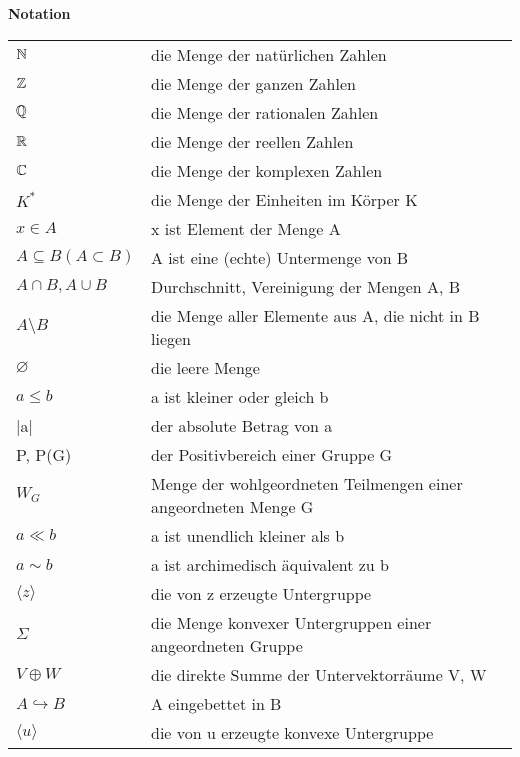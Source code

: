 \newpage
{\LARGE \textbf{Notation}}
\vspace{1.6cm}
\begin{center}
\begin{tabular}{ll}
  $\mathbb{N}$ & die Menge der natürlichen Zahlen \\
  $\mathbb{Z}$ & die Menge der ganzen Zahlen\\
  $\mathbb{Q}$ & die Menge der rationalen Zahlen\\
  $\mathbb{R}$ & die Menge der reellen Zahlen\\
  $\mathbb{C}$ & die Menge der komplexen Zahlen\\
  $K^*$& die Menge der Einheiten im Körper K\\
  $x \in A$ & x ist Element der Menge A\\
  $A\subseteq B (A \subset B)$& A ist eine (echte) Untermenge von B \\
  $A \cap B, A \cup B$ & Durchschnitt, Vereinigung der Mengen A, B\\
  $A \setminus B$ & die Menge aller Elemente aus A, die nicht in B liegen \\
  $\varnothing$ & die leere Menge \\
  $ a \leq b$ & a ist kleiner oder gleich b\\
  |a| & der absolute Betrag von a\\
  P, P(G) & der Positivbereich einer Gruppe G \\
  $W_G$ & Menge der wohlgeordneten Teilmengen einer angeordneten Menge G\\
  $a \ll b$ & a ist unendlich kleiner als b\\
  $a \sim b$ & a ist archimedisch äquivalent zu b\\
  $\langle z \rangle$ & die von z erzeugte Untergruppe\\
  $\Sigma$ & die Menge konvexer Untergruppen einer angeordneten Gruppe\\
  $V \oplus W$ & die direkte Summe der Untervektorräume V, W \\
  $A \hookrightarrow B$ & A eingebettet in B\\
  $\langle u \rangle $ & die von u erzeugte konvexe Untergruppe\\
 \end{tabular}
\end{center}